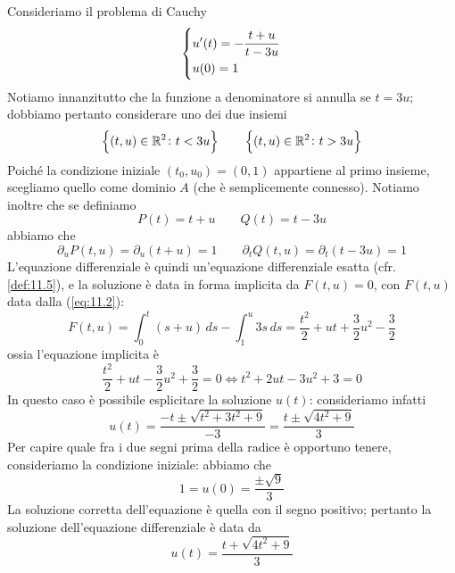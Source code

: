 \begin{example}
    Consideriamo il problema di Cauchy
    \[
    \begin{dcases}
        u'(t) = -\frac{t+u}{t-3u}\\
        u(0) = 1
    \end{dcases}
    \]
    Notiamo innanzitutto che la funzione a denominatore si annulla se $t=3u$; dobbiamo pertanto considerare uno dei due insiemi
    \[
    \left\{(t,u)\in\amsbb{R}^2\colon t<3u\right\} \qquad \left\{(t,u)\in\amsbb{R}^2\colon t>3u\right\}
    \]
    Poiché la condizione iniziale $(t_0, u_0) = (0, 1)$ appartiene al primo insieme, scegliamo quello come dominio $A$ (che è semplicemente connesso). Notiamo inoltre che se definiamo
    \[
    P(t) = t+u \qquad Q(t) = t-3u
    \]
    abbiamo che
    \[
    \partial_u P(t,u) = \partial_u(t+u) = 1 \qquad \partial_t Q(t,u) = \partial_t(t-3u) = 1
    \]
    L'equazione differenziale è quindi un'equazione differenziale esatta (cfr. \ref{def:11.5}), e la soluzione è data in forma implicita da $F(t,u) = 0$, con $F(t,u)$ data dalla (\ref{eq:11.2}):
    \[
    F(t,u) = \int_0^t (s+u)\, ds -\int_1^{u}3s\, ds = \frac{t^2}{2} + ut +\frac{3}{2}u^2-\frac{3}{2}
    \]
    ossia l'equazione implicita è
    \[
    \frac{t^2}{2} +ut-\frac{3}{2}u^2 +\frac{3}{2}=0\iff t^2 +2ut -3u^2+3=0
    \]
    In questo caso è possibile esplicitare la soluzione $u(t)$: consideriamo infatti
    \[
    u(t) = \frac{-t\pm \sqrt{t^2+3t^2+9}}{-3} = \frac{t\pm \sqrt{4t^2+9}}{3}
    \]
    Per capire quale fra i due segni prima della radice è opportuno tenere, consideriamo la condizione iniziale: abbiamo che
    \[
    1 = u(0) = \frac{\pm\sqrt{9}}{3}
    \]
    La soluzione corretta dell'equazione è quella con il segno positivo; pertanto la soluzione dell'equazione differenziale è data da
    \[
    u(t) = \frac{t+\sqrt{4t^2+9}}{3}
    \]
\end{example}
